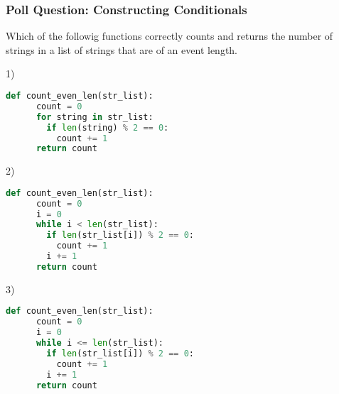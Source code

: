 \documentclass{beamer}
\begin{document}
%
%
\begin{frame}[fragile]
	\frametitle{Poll Question: Constructing Conditionals}
  Which of the followig functions correctly counts and returns the number of strings in a list of strings that are of an event length.
	\vfill
	\begin{minipage}{0.49\textwidth}
    1)
		\begin{lstlisting}[language=Python, autogobble,basicstyle=\tiny,numbers=none]
    def count_even_len(str_list):
      count = 0 
      for string in str_list:
        if len(string) % 2 == 0:
          count += 1
      return count
		\end{lstlisting}
	\end{minipage}
	\begin{minipage}{0.49\textwidth}
    2)
		\begin{lstlisting}[language=Python, autogobble,basicstyle=\tiny,numbers=none]
    def count_even_len(str_list):
      count = 0 
      i = 0
      while i < len(str_list):
        if len(str_list[i]) % 2 == 0:
          count += 1
        i += 1
      return count
		\end{lstlisting}
	\end{minipage}
  \vfill
  \centering
  \begin{minipage}{0.45\textwidth}
    3)
    \begin{lstlisting}[language=Python, autogobble,basicstyle=\tiny,numbers=none]
    def count_even_len(str_list):
      count = 0 
      i = 0
      while i <= len(str_list):
        if len(str_list[i]) % 2 == 0:
          count += 1
        i += 1
      return count
    \end{lstlisting}
  \end{minipage}
\end{frame}
\end{document}
